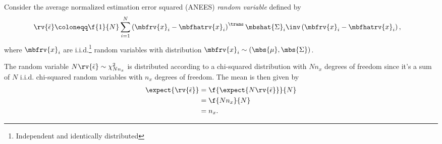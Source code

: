 \documentclass{simple-article}
\begin{document}
Consider the average normalized estimation error squared (ANEES) \emph{random variable} defined by
\begin{align}
  \rv{\bar{\epsilon}} &\coloneqq \f{1}{N}\sum_{i=1}^{N}\left( \mbfrv{x}_{i} - \mbfhatrv{x}_{i} \right)^{\trans}\mbshat{\Sigma}_{i}\inv\left( \mbfrv{x}_{i} - \mbfhatrv{x}_{i} \right),
\end{align}
where $\mbfrv{x}_{i}$ are i.i.d.\footnote{Independent and identically distributed} random variables with distribution $\mbfrv{x}_{i}\sim\left( \mbs{\mu}, \mbs{\Sigma} \right)$. 

\begin{blueBox}
  The random variable $N\rv{\bar{\epsilon}}\sim\chi^{2}_{Nn_{x}}$ is distributed according to a chi-squared distribution with $Nn_{x}$ degrees of freedom since it's a sum of $N$ i.i.d. chi-squared random variables with $n_{x}$ degrees of freedom. The mean is then given by
  \begin{align}
    \expect{\rv{\bar{\epsilon}}} 
            &= \f{\expect{N\rv{\bar{\epsilon}}}}{N}\\
            &= \f{Nn_{x}}{N}\\
            &= n_{x}.
  \end{align}
\end{blueBox}
\end{document}
